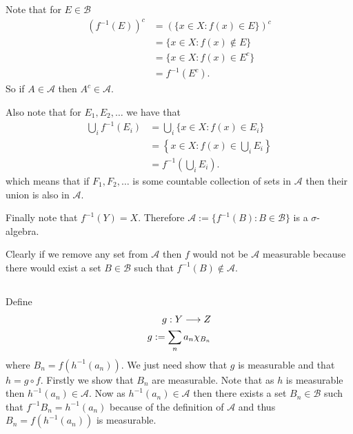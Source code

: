 \documentclass{unswmaths}
\begin{document}
\section{}
\subsection{}
Note that for $ E \in \mathcal{B} $
\begin{align*}
    \left(f^{-1}(E)\right)^c &= \left(\{ x \in X : f(x) \in E \}\right)^c \\
    &= \{ x \in X : f(x) \not\in E \} \\
    &= \{ x \in X : f(x) \in E^c \} \\
    &= f^{-1}(E^c).
\end{align*}
So if $ A \in \mathcal{A} $ then $ A^c \in \mathcal{A} $.

Also note that for $ E_1, E_2, \ldots $ 
we have that
\begin{align*}
    \bigcup_{i} f^{-1}(E_i) &= \bigcup_{i} \{ x \in X : f(x) \in E_i \} \\
        &= \left\{ x \in X : f(x) \in \bigcup_i E_i \right\} \\
        &= f^{-1}\left(\bigcup_i E_i \right).
\end{align*}
which means that if $ F_1, F_2, \ldots $ is some countable collection of sets in $ \mathcal{A} $ then their union is also in $ \mathcal{A} $.

Finally note that $ f^{-1}(Y) = X $. Therefore $ \mathcal{A} := \{ f^{-1}(B) : B \in \mathcal{B} \} $ is a $ \sigma$-algebra. 

Clearly if we remove any set from $ \mathcal{A} $ then $ f $ would not be $ \mathcal{A} $ measurable because there would exist a set $ B \in \mathcal{B} $ such that $ f^{-1}(B) \not\in \mathcal{A} $. 

\subsection{}
Define
\begin{align*}
    g : Y \longrightarrow Z \\
    g := \sum_{n} a_n \chi_{B_n}
\end{align*}
where $ B_n = f(h^{-1}(a_n)) $.
We just need show that $ g $ is measurable and that $ h = g \circ f $.
Firstly we show that $ B_n$ are measurable.
Note that as $ h $ is measurable then $ h^{-1}(a_n) \in \mathcal{A} $. Now as $ h^{-1}(a_n) \in \mathcal{A} $ then there exists a set $ B_n \in \mathcal{B} $ such that
$ f^{-1} B_n = h^{-1}(a_n) $ because of the definition of $ \mathcal{A} $ and thus $ B_n = f(h^{-1}(a_n)) $ is measurable. 
\end{document}
